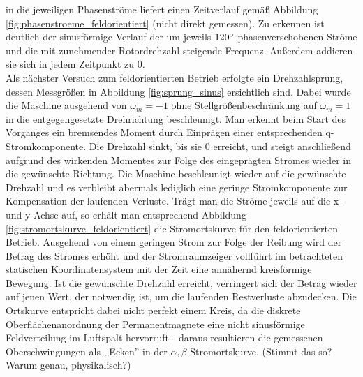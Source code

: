 \noindent in die jeweiligen Phasenströme liefert einen Zeitverlauf gemäß Abbildung \ref{fig:phasenstroeme_feldorientiert} (nicht direkt gemessen). Zu erkennen ist deutlich der sinusförmige Verlauf der um jeweils $120 \degree$ phasenverschobenen Ströme und die mit zunehmender Rotordrehzahl steigende Frequenz. Außerdem addieren sie sich in jedem Zeitpunkt zu 0.\\ 
\noindent Als nächster Versuch zum feldorientierten Betrieb erfolgte ein Drehzahlsprung, dessen Messgrößen in Abbildung \ref{fig:sprung_sinus} ersichtlich sind. Dabei wurde die Maschine ausgehend von $\omega_m=-1$ ohne Stellgrößenbeschränkung auf $\omega_m=1$ in die entgegengesetzte Drehrichtung beschleunigt. Man erkennt beim Start des Vorganges ein bremsendes Moment durch Einprägen einer entsprechenden q-Stromkomponente. Die Drehzahl sinkt, bis sie 0 erreicht, und steigt anschließend aufgrund des wirkenden Momentes zur Folge des eingeprägten Stromes wieder in die gewünschte Richtung. Die Maschine beschleunigt wieder auf die gewünschte Drehzahl und es verbleibt abermals lediglich eine geringe Stromkomponente zur Kompensation der laufenden Verluste. Trägt man die Ströme jeweils auf die x- und y-Achse auf, so erhält man entsprechend Abbildung \ref{fig:stromortskurve_feldorientiert} die Stromortskurve für den feldorientierten Betrieb. Ausgehend von einem geringen Strom zur Folge der Reibung wird der Betrag des Stromes erhöht und der Stromraumzeiger vollführt im betrachteten statischen Koordinatensystem mit der Zeit eine annähernd kreisförmige Bewegung. Ist die gewünschte Drehzahl erreicht, verringert sich der Betrag wieder auf jenen Wert, der notwendig ist, um die laufenden Restverluste abzudecken. Die Ortskurve entspricht dabei nicht perfekt einem Kreis, da die diskrete Oberflächenanordnung der Permanentmagnete eine nicht sinusförmige Feldverteilung im Luftspalt hervorruft - daraus resultieren die gemessenen Oberschwingungen als ,,Ecken'' in der $\alpha,\beta$-Stromortskurve. (Stimmt das so? Warum genau, physikalisch?)










